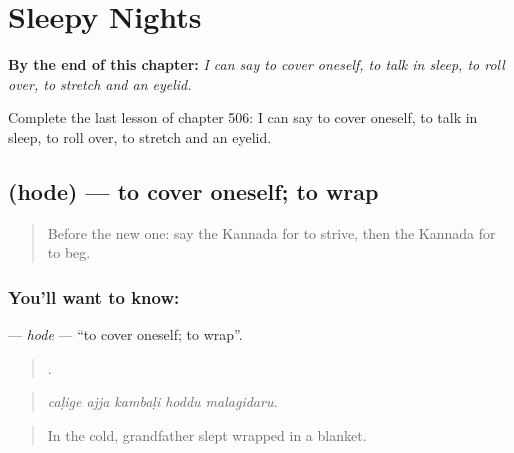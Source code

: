 
\chapter{Sleepy Nights}
\label{ch:ka-sleepy-nights}

\begin{chapteropening}
\textbf{By the end of this chapter:} \emph{I can say to cover oneself, to talk in sleep, to roll over, to stretch and an eyelid.}

Complete the last lesson of chapter 506: I can say to cover oneself, to talk in sleep, to roll over, to stretch and an eyelid.
\end{chapteropening}

\section[\texorpdfstring{\kn{ಹೊದೆ} (hode)}{ಹೊದೆ (hode)}]{ (hode) — to cover oneself; to wrap}

\label{lesson:KA-C506-hode-cover}



\begin{quote}
Before the new one: say the Kannada for to strive, then the Kannada for to beg.
\end{quote}

\subsection*{You'll want to know: }
\textbf{} — \emph{hode} — \textquotedblleft{}to cover oneself; to wrap\textquotedblright{}.

\begin{quote}
    .
\end{quote}

\begin{quote}
\emph{caḷige ajja kambaḷi hoddu malagidaru.}
\end{quote}

\begin{quote}
In the cold, grandfather slept wrapped in a blanket.
\end{quote}


